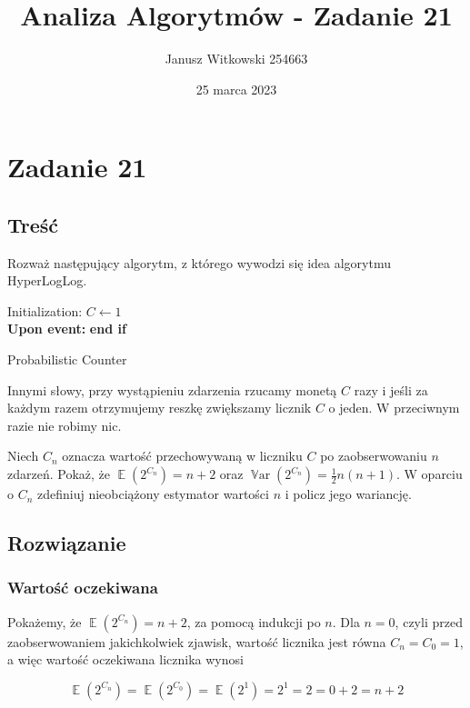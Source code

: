 \documentclass{article}
\title{Analiza Algorytmów - Zadanie 21}
\author{Janusz Witkowski 254663}
\date{25 marca 2023}
\newenvironment{pseudokod}[1][htb]{
	\renewcommand{\algorithmcfname}{}
	\begin{algorithm}[#1]%
	}{
\end{algorithm}
}
\DeclareMathOperator{\EX}{\mathbb{E}}%
\DeclareMathOperator{\Var}{\mathbb{V}ar}%
\begin{document}
    \maketitle
    

    \section{Zadanie 21}
    \subsection{Treść}
    Rozważ następujący algorytm, z którego wywodzi się idea algorytmu HyperLogLog.

    \begin{pseudokod}[H]
    Initialization: $C \leftarrow 1$\\
    \textbf{Upon event:}
    \textbf{end if}
    \caption{Probabilistic Counter}
    \end{pseudokod}

    Innymi słowy, przy wystąpieniu zdarzenia rzucamy monetą $C$ razy i jeśli za każdym razem otrzymujemy reszkę zwiększamy licznik $C$ o jeden. W przeciwnym razie nie robimy nic.

    Niech $C_n$ oznacza wartość przechowywaną w liczniku $C$ po zaobserwowaniu $n$ zdarzeń. Pokaż, że $\EX(2^{C_n}) = n + 2$ oraz $\Var(2^{C_n}) = \frac{1}{2}n(n+1)$. W oparciu o $C_n$ zdefiniuj nieobciążony estymator wartości $n$ i policz jego wariancję.

    \subsection{Rozwiązanie}
    \subsubsection{Wartość oczekiwana}
    Pokażemy, że $\EX(2^{C_n}) = n + 2$, za pomocą indukcji po $n$. Dla $n = 0$, czyli przed zaobserwowaniem jakichkolwiek zjawisk, wartość licznika jest równa $C_n = C_0 = 1$, a więc wartość oczekiwana licznika wynosi

    \[ \EX(2^{C_n}) = \EX(2^{C_0}) = \EX(2^1) = 2^1 = 2 = 0 + 2 = n + 2 \]
\end{document}
